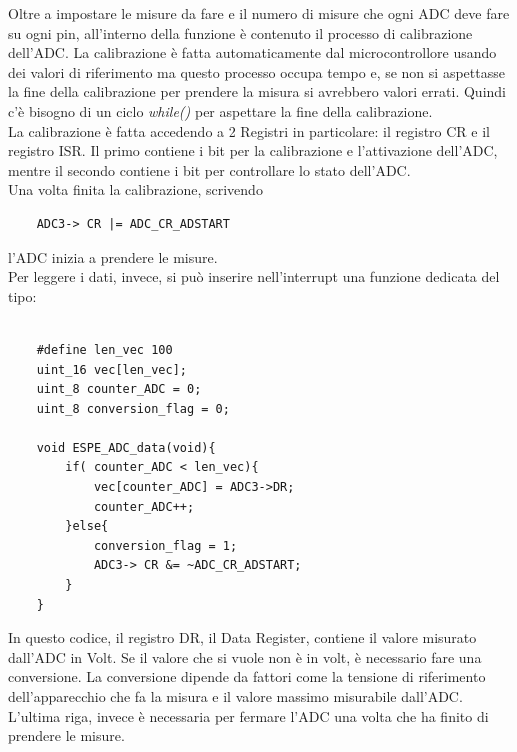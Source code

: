 Oltre a impostare le misure da fare e il numero di misure che ogni ADC deve fare su ogni pin, all'interno della funzione è contenuto il processo di calibrazione dell'ADC. La calibrazione è fatta automaticamente dal microcontrollore usando dei valori di riferimento ma questo processo occupa tempo e, se non si aspettasse la fine della calibrazione per prendere la misura si avrebbero valori errati. Quindi c'è bisogno di un ciclo \textit{while()} per aspettare la fine della calibrazione.\\

La calibrazione è fatta accedendo a 2 Registri in particolare: il registro CR e il registro ISR. Il primo contiene i bit per la calibrazione e l'attivazione dell'ADC, mentre il secondo contiene i bit per controllare lo stato dell'ADC.\\

Una volta finita la calibrazione,  scrivendo
\noindent

\begin{verbatim}
    ADC3-> CR |= ADC_CR_ADSTART
\end{verbatim}
l'ADC inizia a prendere le misure.\\
Per leggere i dati, invece, si può inserire nell'interrupt una funzione dedicata del tipo:

\noindent
\begin{verbatim}

    #define len_vec 100
    uint_16 vec[len_vec];
    uint_8 counter_ADC = 0;
    uint_8 conversion_flag = 0;

    void ESPE_ADC_data(void){
        if( counter_ADC < len_vec){
            vec[counter_ADC] = ADC3->DR;
            counter_ADC++;
        }else{
            conversion_flag = 1;
            ADC3-> CR &= ~ADC_CR_ADSTART;
        }
    }

\end{verbatim}
\label{code:ADC_data}

In questo codice, il registro DR, il Data Register, contiene il valore misurato dall'ADC in Volt. Se il valore che si vuole non è in volt, è necessario fare una conversione. La conversione dipende da fattori come la tensione di riferimento dell'apparecchio che fa la misura e il valore massimo misurabile dall'ADC.\\

L'ultima riga, invece è necessaria per fermare l'ADC una volta che ha finito di prendere le misure.\\